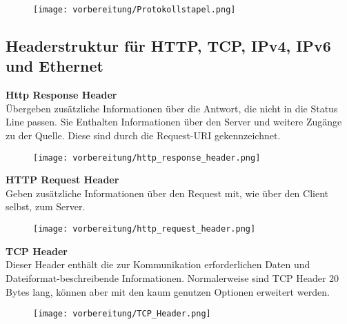     \begin{figure}[H]
        \centering
        \texttt{[image: vorbereitung/Protokollstapel.png]}
    \end{figure}
\pagebreak
\subsection{Headerstruktur für HTTP, TCP, IPv4, IPv6 und Ethernet}

    \textbf{Http Response Header}
    \\
    Übergeben zusätzliche Informationen über die Antwort, die nicht in die Status Line passen. Sie Enthalten Informationen über den Server und weitere Zugänge zu der Quelle. Diese sind durch die Request-URI gekennzeichnet.\\

    \begin{figure}[H]
        \centering
        \texttt{[image: vorbereitung/http\_response\_header.png]}
    \end{figure}

    \textbf{HTTP Request Header}
    \\
    Geben zusätzliche Informationen über den Request mit, wie über den Client selbst, zum Server. \\
    \begin{figure}[H]
        \centering
        \texttt{[image: vorbereitung/http\_request\_header.png]}
    \end{figure}

    \textbf{TCP Header}
    \\
    Dieser Header enthält die zur Kommunikation erforderlichen Daten und Dateiformat-beschreibende Informationen. Normalerweise sind TCP Header 20 Bytes lang, können aber mit den kaum genutzen Optionen erweitert werden.\\

    \begin{figure}[H]
        \centering
        \texttt{[image: vorbereitung/TCP\_Header.png]}
    \end{figure}


